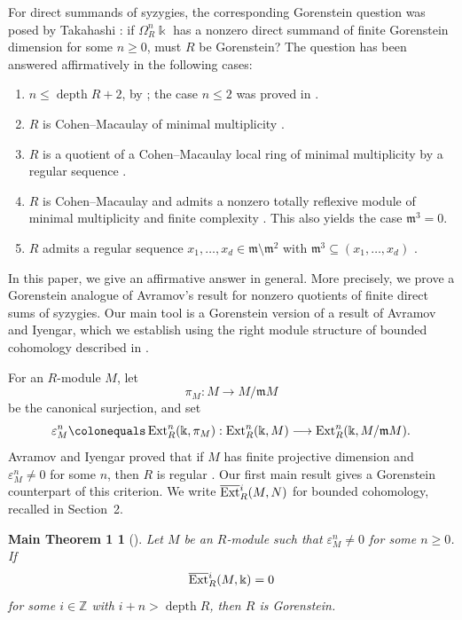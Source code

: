 \documentclass{amsart}
\newtheorem*{maintheorem1}{Main Theorem 1}
\theoremstyle{definition}
\theoremstyle{definition}
\theoremstyle{remark}
\numberwithin{equation}{section}
\newcommand{\bbZ}{\mathbb{Z}}
\newcommand{\kk}{\Bbbk}
\newcommand{\Ext}{\operatorname{Ext}}
\newcommand{\bExt}{\overline{\operatorname{Ext}}{\vphantom E}}
\newcommand{\m}{\mathfrak{m}}
\newcommand{\depth}{\operatorname{depth}}
\begin{document}
For direct summands of syzygies, the corresponding Gorenstein
question was posed by Takahashi \cite[Question 1.0.2]{tak}: if
$\Omega_R^n\kk$ has a nonzero direct summand of finite Gorenstein
dimension for some $n\geq0$, must $R$ be Gorenstein? The question
has been answered affirmatively in the following cases:
\begin{enumerate}
\item $n\leq\depth R+2$, by
\cite[Theorem 6.5]{tak2006}; the case $n\leq2$ was proved
in \cite{tak}.
\item $R$ is Cohen--Macaulay of minimal multiplicity
\cite[Corollary 5.3]{GhoshSyzygies}.
\item $R$ is a quotient of a Cohen--Macaulay local ring of minimal
multiplicity by a regular sequence
\cite[Theorem 7.5]{GhoshPuthenpurakal}.
\item $R$ is Cohen--Macaulay and admits a nonzero totally reflexive
module of minimal multiplicity and finite complexity
\cite[Corollary 3.7]{GheibiTakahashi}. This also yields the case
$\m^3=0$.
\item $R$ admits a regular sequence
$x_1,\ldots,x_d\in\m\setminus\m^2$ with
$\m^3\subseteq(x_1,\ldots,x_d)$
\cite[Corollary 3.3]{GhoshShort}.
\end{enumerate}
In this paper, we give an affirmative answer in general. More
precisely, we prove a Gorenstein analogue of Avramov's result for
nonzero quotients of finite direct sums of syzygies. Our main tool
is a Gorenstein version of a result of Avramov and Iyengar, which
we establish using the right module structure of bounded
cohomology described in \cite{bimodule}.

For an $R$-module $M$, let
\[
\pi_M:M\longrightarrow M/\m M
\]
be the canonical surjection, and set
\[
\varepsilon_M^n
\colonequals
\Ext_R^n(\kk,\pi_M):
\Ext_R^n(\kk,M)
\longrightarrow
\Ext_R^n(\kk,M/\m M).
\]
Avramov and Iyengar proved that if $M$ has finite projective
dimension and $\varepsilon_M^n\neq0$ for some $n$, then $R$ is
regular \cite[Theorem 2.4 (iii)$\Rightarrow$(i)]{AIBass}. Our first main result gives
a Gorenstein counterpart of this criterion. We write
$\bExt_R^i(M,N)$ for bounded cohomology, recalled in Section~2.

\begin{maintheorem1}[]
Let $M$ be an $R$-module such that $\varepsilon_M^n\neq0$ for some
$n\geq0$. If
\[
\bExt_R^i(M,\kk)=0
\]
for some $i\in\bbZ$ with $i+n>\depth R$, then $R$ is Gorenstein.
\end{maintheorem1}
\end{document}
